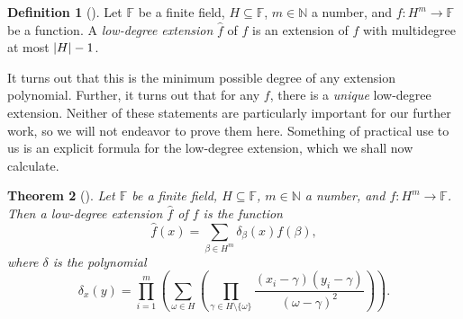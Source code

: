 \documentclass{reedthesis}
\theoremstyle{plain}
\newtheorem{thm}{Theorem}[section]
\theoremstyle{definition}
\newtheorem{defn}[thm]{Definition}
\theoremstyle{remark}
\DeclarePairedDelimiter{\abs}{\lvert}{\rvert}
\numberwithin{equation}{section}
\begin{document}
\begin{defn}[{\cite[]{CFGS22}}]\label{def:low-deg-ext}
  Let $\mathbb{F}$ be a finite field, $H \subseteq \mathbb{F}$, $m \in \mathbb{N}$ a number, and
  $f: H^{m} \rightarrow \mathbb{F}$ be a function. A \emph{low-degree extension} $\hat{f}$
  of $f$ is an extension of $f$ with multidegree at most $\abs{H} - 1$.
\end{defn}

It turns out that this is the minimum possible degree of any extension
polynomial. Further, it turns out that for any $f$, there is a \emph{unique}
low-degree extension. Neither of these statements are particularly important for
our further work, so we will not endeavor to prove them here. Something of
practical use to us is an explicit formula for the low-degree extension, which
we shall now calculate.

\begin{thm}[{\cite[]{CFGS22}}]\label{thm:low-deg-ext-exists}
  Let $\mathbb{F}$ be a finite field, $H \subseteq \mathbb{F}$, $m \in \mathbb{N}$ a number, and
  $f: H^{m} \rightarrow \mathbb{F}$. Then a low-degree extension $\hat{f}$ of $f$ is the
  function
  \begin{equation}
    \hat{f}(x) = \sum_{\beta \in H^{m}}\delta_{\beta}(x)f(\beta),
  \end{equation}
  where $\delta$ is the polynomial
  \begin{equation}\label{eqn:delta-poly}
    \delta_{x}(y) = \prod_{i = 1}^{m}\left(\sum_{\omega \in H}\left(
        \prod_{\gamma \in H \setminus \{\omega\}}\frac{(x_{i} - \gamma)(y_{i} - \gamma)}{(\omega - \gamma)^{2}}
      \right)\right).
  \end{equation}
\end{thm}
\end{document}
